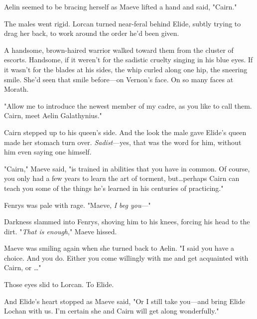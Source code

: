 Aelin seemed to be bracing herself as Maeve lifted a hand and said, "Cairn."

The males went rigid.
Lorcan turned near-feral behind Elide, subtly trying to drag her back, to work around the order he'd been given.

A handsome, brown-haired warrior walked toward them from the cluster of escorts.
Handsome, if it weren't for the sadistic cruelty singing in his blue eyes.
If it wasn't for the blades at his sides, the whip curled along one hip, the sneering smile.
She'd seen that smile before---on Vernon's face.
On so many faces at Morath.

"Allow me to introduce the newest member of my cadre, as you like to call them.
Cairn, meet Aelin Galathynius."

Cairn stepped up to his queen's side.
And the look the male gave Elide's queen made her stomach turn over.
\emph{Sadist}---yes, that was the word for him, without him even saying one himself.

"Cairn," Maeve said, "is trained in abilities that you have in common.
Of course, you only had a few years to learn the art of torment, but\ldots perhaps Cairn can teach you some of the things he's learned in his centuries of practicing."

Fenrys was pale with rage.
"Maeve, \emph{I beg you}---"

Darkness slammed into Fenrys, shoving him to his knees, forcing his head to the dirt.
"\emph{That is enough}," Maeve hissed.

Maeve was smiling again when she turned back to Aelin.
"I said you have a choice.
And you do.
Either you come willingly with me and get acquainted with Cairn, or \ldots"

Those eyes slid to Lorcan.
To Elide.

And Elide's heart stopped as Maeve said, "Or I still take you---and bring Elide Lochan with us.
I'm certain she and Cairn will get along wonderfully."

